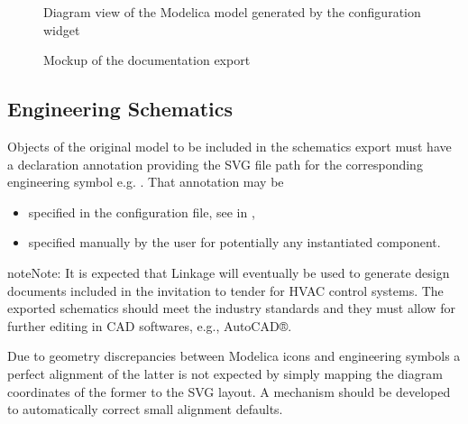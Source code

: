 \documentclass[letterpaper,10pt, openany,english]{sphinxmanual}
\begin{document}
\begin{figure}[htbp]
\centering
\capstart

\noindent{}
\caption{Diagram view of the Modelica model generated by the configuration widget}\label{\detokenize{requirements:screen-schematics-modelica}}\end{figure}

\begin{figure}[htbp]
\centering
\capstart

\noindent{}
\caption{Mockup of the documentation export}\label{\detokenize{requirements:screen-schematics-output}}\end{figure}


\subsection{Engineering Schematics}
\label{\detokenize{requirements:engineering-schematics}}
Objects of the original model to be included in the schematics export must have a declaration annotation providing the SVG file path for the corresponding engineering symbol e.g. . That annotation may be
\begin{itemize}
\item {} 
specified in the configuration file, see  in {\hyperref[\detokenize{requirements:configuration-data}]{}},

\item {} 
specified manually by the user for potentially any instantiated component.

\end{itemize}

\begin{sphinxadmonition}{note}{Note:}
It is expected that Linkage will eventually be used to generate design documents included in the invitation to tender for HVAC control systems. The exported schematics should meet the industry standards and they must allow for further editing in CAD softwares, e.g., AutoCAD®.

Due to geometry discrepancies between Modelica icons and engineering symbols a perfect alignment of the latter is not expected by simply mapping the diagram coordinates of the former to the SVG layout. A mechanism should be developed to automatically correct small alignment defaults.
\end{sphinxadmonition}
\end{document}
